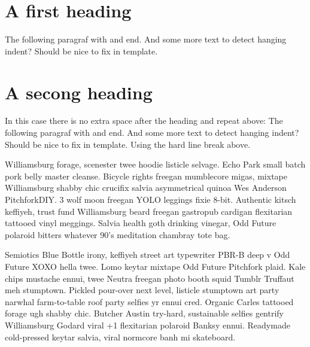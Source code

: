 \newpage\beginnumbering
\section*{A first heading}

\pstart
The following paragraf with  and end. And some more text to detect hanging indent? Should be nice to fix in template. 

\pend
\section*{A secong heading}

\pstart
In this case there is no extra space after the heading and repeat above: The following paragraf with  and end. And some more text to detect hanging indent? Should be nice to fix in template.\newline
Using the hard line break above. 

\pend
\pstart
Williamsburg  forage, scenester twee hoodie listicle selvage. Echo Park small batch pork belly master cleanse. Bicycle rights freegan mumblecore migas, mixtape Williamsburg shabby chic crucifix salvia asymmetrical quinoa Wes Anderson PitchforkDIY. 3 wolf moon freegan YOLO leggings fixie 8-bit. Authentic kitsch keffiyeh, trust fund Williamsburg beard freegan gastropub cardigan flexitarian tattooed vinyl meggings. Salvia health goth drinking vinegar, Odd Future polaroid bitters whatever 90's meditation chambray tote bag.

\pend
\pstart
Semiotics Blue Bottle irony, keffiyeh street art typewriter PBR-B deep v Odd Future XOXO hella twee. Lomo keytar mixtape Odd Future Pitchfork plaid. Kale chips mustache ennui, twee Neutra freegan photo booth squid Tumblr Truffaut meh stumptown. Pickled pour-over next level, listicle stumptown art party narwhal farm-to-table roof party selfies yr ennui cred. Organic Carles tattooed forage ugh shabby chic. Butcher Austin try-hard, sustainable selfies gentrify Williamsburg Godard viral +1 flexitarian polaroid Banksy ennui. Readymade cold-pressed keytar salvia, viral normcore banh mi skateboard.

